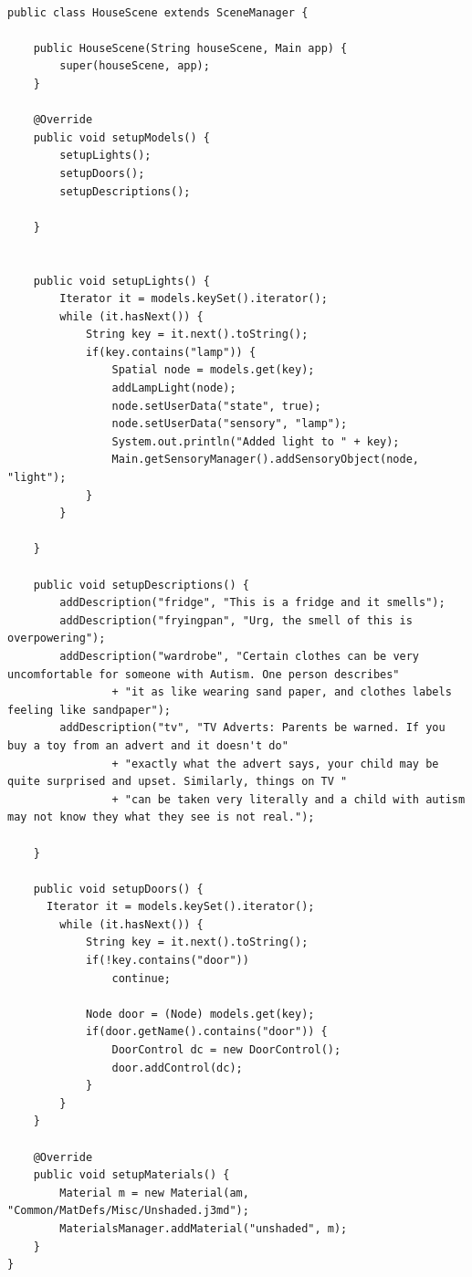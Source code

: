 \begin{lstlisting}[breaklines=true]

public class HouseScene extends SceneManager {

    public HouseScene(String houseScene, Main app) {
        super(houseScene, app);
    }

    @Override
    public void setupModels() {
        setupLights();
        setupDoors();
        setupDescriptions();

    }
    
    
    public void setupLights() {
        Iterator it = models.keySet().iterator();
        while (it.hasNext()) {
            String key = it.next().toString();
            if(key.contains("lamp")) {
                Spatial node = models.get(key);
                addLampLight(node);
                node.setUserData("state", true);
                node.setUserData("sensory", "lamp");
                System.out.println("Added light to " + key);
                Main.getSensoryManager().addSensoryObject(node, "light");
            }
        }
        
    }
    
    public void setupDescriptions() {
        addDescription("fridge", "This is a fridge and it smells");
        addDescription("fryingpan", "Urg, the smell of this is overpowering");
        addDescription("wardrobe", "Certain clothes can be very uncomfortable for someone with Autism. One person describes"
                + "it as like wearing sand paper, and clothes labels feeling like sandpaper");
        addDescription("tv", "TV Adverts: Parents be warned. If you buy a toy from an advert and it doesn't do"
                + "exactly what the advert says, your child may be quite surprised and upset. Similarly, things on TV "
                + "can be taken very literally and a child with autism may not know they what they see is not real.");
        
    }
    
    public void setupDoors() {
      Iterator it = models.keySet().iterator();
        while (it.hasNext()) {
            String key = it.next().toString();
            if(!key.contains("door")) 
                continue; 
            
            Node door = (Node) models.get(key);
            if(door.getName().contains("door")) {
                DoorControl dc = new DoorControl();
                door.addControl(dc);               
            }
        }
    }

    @Override
    public void setupMaterials() {
        Material m = new Material(am, "Common/MatDefs/Misc/Unshaded.j3md");
        MaterialsManager.addMaterial("unshaded", m); 
    }
}

\end{lstlisting}

